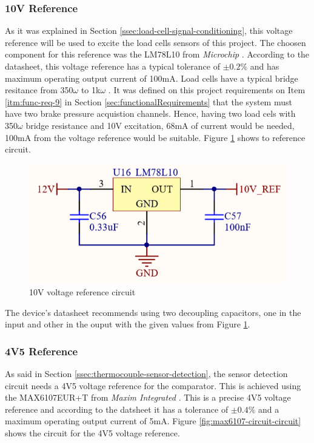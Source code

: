 		\subsubsection{10V Reference}\label{sssec:10v-reference}
			As it was explained in Section \ref{ssec:load-cell-signal-conditioning}, this voltage reference will be used to excite the load cells sensors of this project. The choosen component for this reference was the LM78L10 from \textit{Microchip} \cite{LM78L10-datasheet}. According to the datasheet, this voltage reference has a typical tolerance of $\pm 0.2\%$ and has maximum operating output current of 100mA. Load cells have a typical bridge resitance from 350$\omega$ to 1k$\omega$ \cite{GMIloadcell}. It was defined on this project requirements on Item \ref{itm:func-req-9} in Section \ref{sec:functionalRequirements} that the system must have two brake pressure acquistion channels. Hence, having two load cels with 350$\omega$ bridge resistance and 10V excitation, 68mA of current would be needed, 100mA from the voltage reference would be suitable. Figure \ref{fig:LM78L10-circuit} shows to reference circuit.

			\begin{figure}[htbp]
				\centering
					\includegraphics[scale=1.35]{figuras/fig-LM78L10-circuit.png}
				\caption{10V voltage reference circuit \cite{LM78L10-circuit}}
				\label{fig:LM78L10-circuit}
			\end{figure}

			The device's datasheet recommends using two decoupling capacitors, one in the input and other in the ouput with the given values from Figure \ref{fig:LM78L10-circuit}.

		\subsubsection{4V5 Reference}\label{sssec:4v5-reference}

			As said in Section \ref{ssec:thermocouple-sensor-detection}, the sensor detection circuit needs a 4V5 voltage reference for the comparator. This is achieved using the MAX6107EUR+T from \textit{Maxim Integrated} \cite{max6107eur+t-datasheet}. This is a precise 4V5 voltage reference and according to the datsheet it has a tolerance of $\pm0.4\%$ and a maximum operating output current of 5mA. Figure \ref{fig:max6107-circuit-circuit} shows the circuit for the 4V5 voltage reference.

